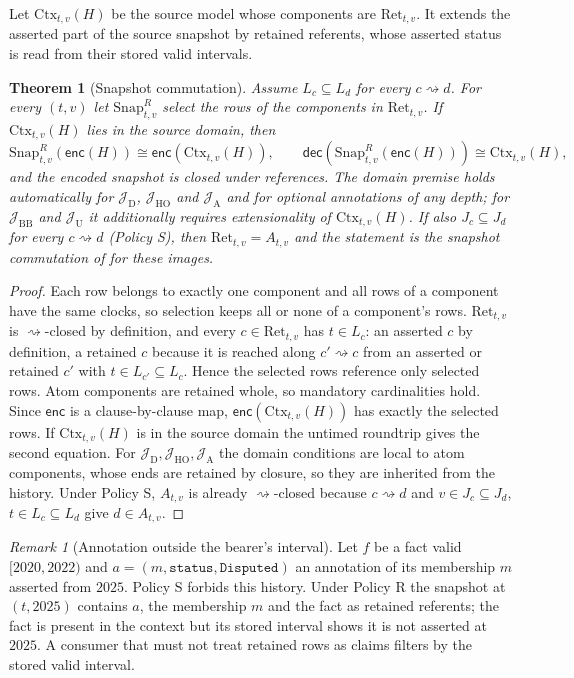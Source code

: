 \documentclass[11pt]{article}
\theoremstyle{plain}
\newtheorem{theorem}{Theorem}
\theoremstyle{definition}
\theoremstyle{remark}
\newtheorem{remark}{Remark}
\newcommand{\enc}{\mathsf{enc}}
\newcommand{\dec}{\mathsf{dec}}
\newcommand{\iri}[1]{\texttt{#1}}
\newcommand{\Img}[1]{\mathcal J_{\mathrm{#1}}}
\newcommand{\dep}{\rightsquigarrow}
\begin{document}
Let $\mathrm{Ctx}_{t,v}(H)$ be the source model whose components are $\mathrm{Ret}_{t,v}$.
It extends the asserted part of the source snapshot by retained referents, whose
asserted status is read from their stored valid intervals.

\begin{theorem}[Snapshot commutation]\label{thm:time}
Assume $L_c\subseteq L_d$ for every $c\dep d$. For every $(t,v)$ let
$\mathrm{Snap}^{R}_{t,v}$ select the rows of the components in $\mathrm{Ret}_{t,v}$.
If $\mathrm{Ctx}_{t,v}(H)$ lies in the source domain, then
\[
\mathrm{Snap}^{R}_{t,v}(\enc(H))\cong\enc(\mathrm{Ctx}_{t,v}(H)),\qquad
\dec(\mathrm{Snap}^{R}_{t,v}(\enc(H)))\cong\mathrm{Ctx}_{t,v}(H),
\]
and the encoded snapshot is closed under references. The domain premise holds
automatically for $\Img{D}$, $\Img{HO}$ and $\Img{A}$ and for optional annotations of
any depth; for $\Img{BB}$ and $\Img{U}$ it additionally requires extensionality of
$\mathrm{Ctx}_{t,v}(H)$. If also $J_c\subseteq J_d$ for every $c\dep d$ (Policy S), then
$\mathrm{Ret}_{t,v}=A_{t,v}$ and the statement is the snapshot commutation of
\cite{pavlyshyn2026lbg} for these images.
\end{theorem}
\begin{proof}
Each row belongs to exactly one component and all rows of a component have the same
clocks, so selection keeps all or none of a component's rows. $\mathrm{Ret}_{t,v}$ is
$\dep$-closed by definition, and every $c\in\mathrm{Ret}_{t,v}$ has $t\in L_c$: an
asserted $c$ by definition, a retained $c$ because it is reached along $c'\dep c$ from
an asserted or retained $c'$ with $t\in L_{c'}\subseteq L_c$. Hence the selected rows
reference only selected rows. Atom components are retained whole, so mandatory
cardinalities hold. Since $\enc$ is a clause-by-clause map, $\enc(\mathrm{Ctx}_{t,v}(H))$ has
exactly the selected rows. If $\mathrm{Ctx}_{t,v}(H)$ is in the source domain the untimed
roundtrip gives the second equation. For $\Img{D},\Img{HO},\Img{A}$ the domain conditions
are local to atom components, whose ends are retained by closure, so they are
inherited from the history. Under Policy S, $A_{t,v}$ is already $\dep$-closed because
$c\dep d$ and $v\in J_c\subseteq J_d$, $t\in L_c\subseteq L_d$ give $d\in A_{t,v}$.
\end{proof}
\begin{remark}[Annotation outside the bearer's interval]
Let $f$ be a fact valid $[2020,2022)$ and $a=(m,\iri{status},\iri{Disputed})$ an annotation of
its membership $m$ asserted from $2025$. Policy S forbids this history. Under Policy R
the snapshot at $(t,2025)$ contains $a$, the membership $m$ and the fact as retained
referents; the fact is present in the context but its stored interval shows it is not
asserted at $2025$. A consumer that must not treat retained rows as claims filters by the
stored valid interval.
\end{remark}
\end{document}
